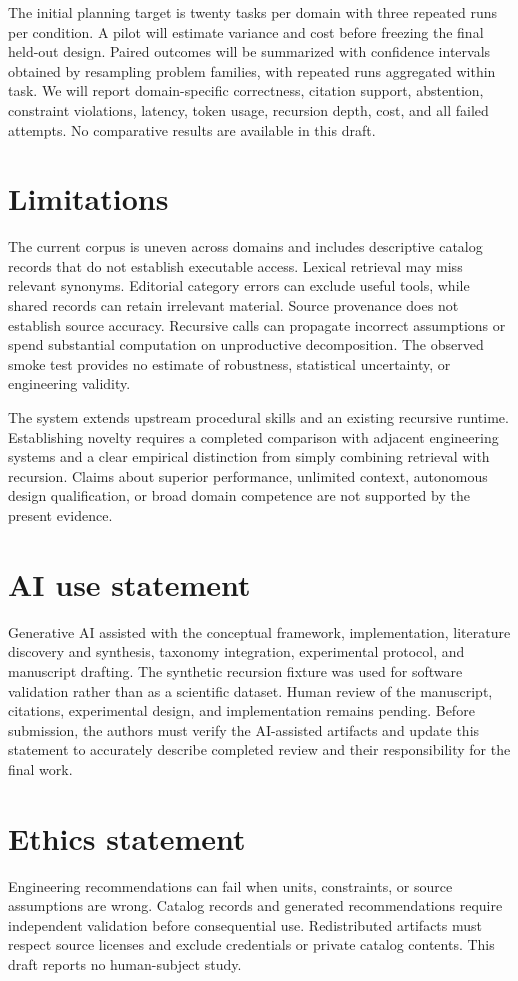 \documentclass{article}
\begin{document}
The initial planning target is twenty tasks per domain with three repeated runs per condition. A pilot will estimate variance and cost before freezing the final held-out design. Paired outcomes will be summarized with confidence intervals obtained by resampling problem families, with repeated runs aggregated within task. We will report domain-specific correctness, citation support, abstention, constraint violations, latency, token usage, recursion depth, cost, and all failed attempts. No comparative results are available in this draft.

\section{Limitations}
The current corpus is uneven across domains and includes descriptive catalog records that do not establish executable access. Lexical retrieval may miss relevant synonyms. Editorial category errors can exclude useful tools, while shared records can retain irrelevant material. Source provenance does not establish source accuracy. Recursive calls can propagate incorrect assumptions or spend substantial computation on unproductive decomposition. The observed smoke test provides no estimate of robustness, statistical uncertainty, or engineering validity.

The system extends upstream procedural skills and an existing recursive runtime. Establishing novelty requires a completed comparison with adjacent engineering systems and a clear empirical distinction from simply combining retrieval with recursion. Claims about superior performance, unlimited context, autonomous design qualification, or broad domain competence are not supported by the present evidence.

\section*{AI use statement}
Generative AI assisted with the conceptual framework, implementation, literature discovery and synthesis, taxonomy integration, experimental protocol, and manuscript drafting. The synthetic recursion fixture was used for software validation rather than as a scientific dataset. Human review of the manuscript, citations, experimental design, and implementation remains pending. Before submission, the authors must verify the AI-assisted artifacts and update this statement to accurately describe completed review and their responsibility for the final work.

\section*{Ethics statement}
Engineering recommendations can fail when units, constraints, or source assumptions are wrong. Catalog records and generated recommendations require independent validation before consequential use. Redistributed artifacts must respect source licenses and exclude credentials or private catalog contents. This draft reports no human-subject study.
\end{document}
